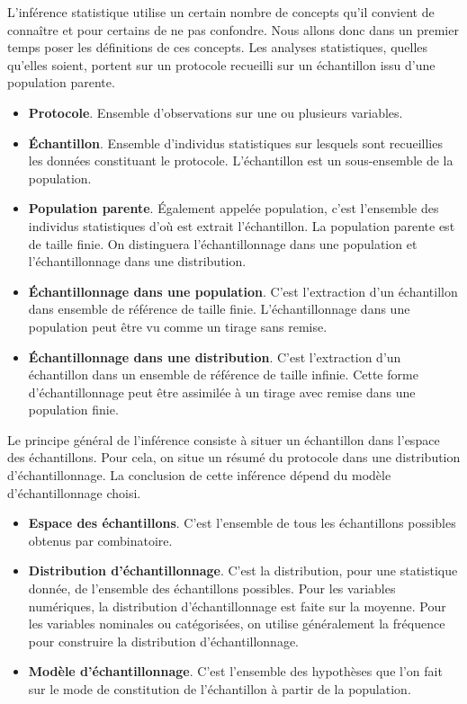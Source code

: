 \documentclass[]{book}
\providecommand{\tightlist}{%
  \setlength{\itemsep}{0pt}\setlength{\parskip}{0pt}}
\theoremstyle{definition}
\theoremstyle{definition}
\theoremstyle{definition}
\theoremstyle{remark}
\begin{document}
L'inférence statistique utilise un certain nombre de concepts qu'il
convient de connaître et pour certains de ne pas confondre. Nous allons
donc dans un premier temps poser les définitions de ces concepts. Les
analyses statistiques, quelles qu'elles soient, portent sur un protocole
recueilli sur un échantillon issu d'une population parente.

\begin{itemize}
\tightlist
\item
  \textbf{Protocole}. Ensemble d'observations sur une ou plusieurs
  variables.
\item
  \textbf{Échantillon}. Ensemble d'individus statistiques sur lesquels
  sont recueillies les données constituant le protocole. L'échantillon
  est un sous-ensemble de la population.
\item
  \textbf{Population parente}. Également appelée population, c'est
  l'ensemble des individus statistiques d'où est extrait l'échantillon.
  La population parente est de taille finie. On distinguera
  l'échantillonnage dans une population et l'échantillonnage dans une
  distribution.
\item
  \textbf{Échantillonnage dans une population}. C'est l'extraction d'un
  échantillon dans ensemble de référence de taille finie.
  L'échantillonnage dans une population peut être vu comme un tirage
  sans remise.
\item
  \textbf{Échantillonnage dans une distribution}. C'est l'extraction
  d'un échantillon dans un ensemble de référence de taille infinie.
  Cette forme d'échantillonnage peut être assimilée à un tirage avec
  remise dans une population finie.
\end{itemize}

Le principe général de l'inférence consiste à situer un échantillon dans
l'espace des échantillons. Pour cela, on situe un résumé du protocole
dans une distribution d'échantillonnage. La conclusion de cette
inférence dépend du modèle d'échantillonnage choisi.

\begin{itemize}
\tightlist
\item
  \textbf{Espace des échantillons}. C'est l'ensemble de tous les
  échantillons possibles obtenus par combinatoire.
\item
  \textbf{Distribution d'échantillonnage}. C'est la distribution, pour
  une statistique donnée, de l'ensemble des échantillons possibles. Pour
  les variables numériques, la distribution d'échantillonnage est faite
  sur la moyenne. Pour les variables nominales ou catégorisées, on
  utilise généralement la fréquence pour construire la distribution
  d'échantillonnage.
\item
  \textbf{Modèle d'échantillonnage}. C'est l'ensemble des hypothèses que
  l'on fait sur le mode de constitution de l'échantillon à partir de la
  population.
\end{itemize}
\end{document}
